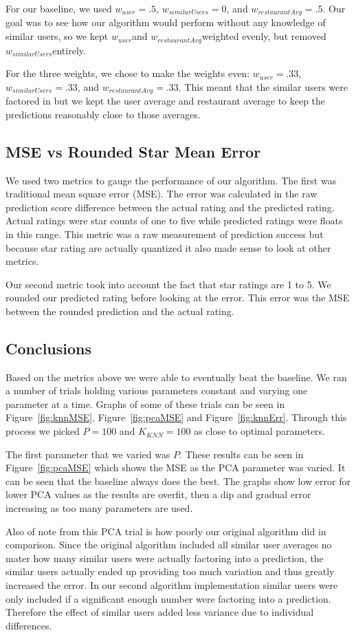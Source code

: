\documentclass[10pt,twocolumn,letterpaper]{article}
\newcommand{\wu}{\ensuremath{w_{user}}}
\newcommand{\ws}{\ensuremath{w_{similarUsers}}}
\newcommand{\wrst}{\ensuremath{w_{restaurantAvg}}}
\begin{document}
For our baseline, we used $\wu=.5$, $\ws=0$, and $\wrst=.5$. Our goal was to see how our algorithm would perform without any knowledge of similar users, so we kept \wu and \wrst weighted evenly, but removed \ws entirely.

For the three weights, we chose to make the weights even: $\wu=.33$, $\ws=.33$, and $\wrst=.33$. This meant that the similar users were factored in but we kept the user average and restaurant average to keep the predictions reasonably close to those averages.

\subsection{MSE vs Rounded Star Mean Error}
We used two metrics to gauge the performance of our algorithm. The first was traditional mean square error (MSE). The error was calculated in the raw prediction score difference between the actual rating and the predicted rating. Actual ratings were star counts of one to five while predicted ratings were floats in this range. This metric was a raw measurement of prediction success but because star rating are actually quantized it also made sense to look at other metrics.

Our second metric took into account the fact that star ratings are 1 to 5. We rounded our predicted rating before looking at the error. This error was the MSE between the rounded prediction and the actual rating.

\subsection{Conclusions}
Based on the metrics above we were able to eventually beat the baseline. We ran a number of trials holding various parameters constant and varying one parameter at a time. Graphs of some of these trials can be seen in Figure~\ref{fig:knnMSE}, Figure~\ref{fig:pcaMSE} and Figure~\ref{fig:knnErr}. Through this process we picked $P=100$ and $K_{KNN}=100$ as close to optimal parameters.

The first parameter that we varied was $P$. These results can be seen in Figure~\ref{fig:pcaMSE} which shows the MSE as the PCA parameter was varied. It can be seen that the baseline always does the best. The graphs show low error for lower PCA values as the results are overfit, then a dip and gradual error increasing as too many parameters are used.

Also of note from this PCA trial is how poorly our original algorithm did in comparison. Since the original algorithm included all similar user averages no mater how many similar users were actually factoring into a prediction, the similar users actually ended up providing too much variation and thus greatly increased the error. In our second algorithm implementation similar users were only included if a significant enough number were factoring into a prediction. Therefore the effect of similar users added less variance due to individual differences.
\end{document}
